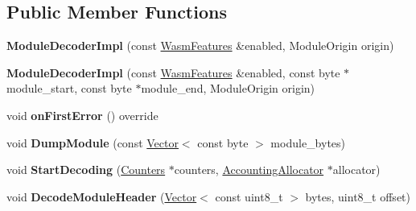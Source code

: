 \subsection*{Public Member Functions}
\begin{DoxyCompactItemize}
\item 
\mbox{\label{classv8_1_1internal_1_1wasm_1_1ModuleDecoderImpl_ace53d7ea18286d99c05bc069acec7097}} 
{\bfseries Module\+Decoder\+Impl} (const \mbox{\hyperlink{structv8_1_1internal_1_1wasm_1_1WasmFeatures}{Wasm\+Features}} \&enabled, Module\+Origin origin)
\item 
\mbox{\label{classv8_1_1internal_1_1wasm_1_1ModuleDecoderImpl_a4c37124343c89390191cd8724bf653df}} 
{\bfseries Module\+Decoder\+Impl} (const \mbox{\hyperlink{structv8_1_1internal_1_1wasm_1_1WasmFeatures}{Wasm\+Features}} \&enabled, const byte $\ast$module\+\_\+start, const byte $\ast$module\+\_\+end, Module\+Origin origin)
\item 
\mbox{\label{classv8_1_1internal_1_1wasm_1_1ModuleDecoderImpl_a0dbc62a78a3b2ad2e3f7f0eb4ad119dd}} 
void {\bfseries on\+First\+Error} () override
\item 
\mbox{\label{classv8_1_1internal_1_1wasm_1_1ModuleDecoderImpl_a193713f7ad4b620b3b68075439536c7d}} 
void {\bfseries Dump\+Module} (const \mbox{\hyperlink{classv8_1_1internal_1_1Vector}{Vector}}$<$ const byte $>$ module\+\_\+bytes)
\item 
\mbox{\label{classv8_1_1internal_1_1wasm_1_1ModuleDecoderImpl_a05458c91aa6c110542c5a7fe9b213427}} 
void {\bfseries Start\+Decoding} (\mbox{\hyperlink{classv8_1_1internal_1_1Counters}{Counters}} $\ast$counters, \mbox{\hyperlink{classv8_1_1internal_1_1AccountingAllocator}{Accounting\+Allocator}} $\ast$allocator)
\item 
\mbox{\label{classv8_1_1internal_1_1wasm_1_1ModuleDecoderImpl_acce01c02979d5aa55a9a9ab6c0f34d40}} 
void {\bfseries Decode\+Module\+Header} (\mbox{\hyperlink{classv8_1_1internal_1_1Vector}{Vector}}$<$ const uint8\+\_\+t $>$ bytes, uint8\+\_\+t offset)

\end{DoxyCompactItemize}
